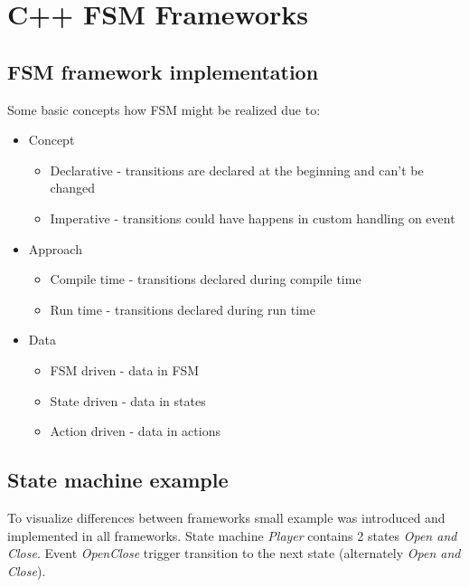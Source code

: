 \section{C++ FSM Frameworks}

\subsection{FSM framework implementation}
Some basic concepts how FSM might be realized due to:

\begin{itemize}
\item Concept
    \begin{itemize}
        \item Declarative - transitions are declared at the beginning and can't be changed
        \item Imperative - transitions could have happens in custom handling on event
    \end{itemize}

\item Approach
    \begin{itemize}
        \item Compile time - transitions declared during compile time
        \item Run time - transitions declared during run time
    \end{itemize}

\item Data
    \begin{itemize}
        \item FSM driven - data in FSM
        \item State driven - data in states
        \item Action driven - data in actions
    \end{itemize}
\end{itemize}

\subsection{State machine example}
To visualize differences between frameworks small example was introduced
and implemented in all frameworks. State machine \textit{Player} contains 2 states \textit{Open and Close}.
Event \textit{OpenClose} trigger transition to the next state
(alternately \textit{Open and Close}).

